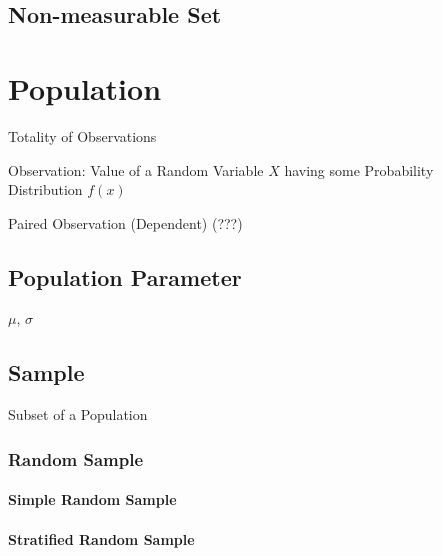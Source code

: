 \subsection{Non-measurable Set}\label{sec:nonmeasurable_set}



\section{Population}\label{sec:population}

Totality of Observations

Observation: Value of a Random Variable $X$ having some Probability
Distribution $f(x)$

Paired Observation (Dependent) (???)



\subsection{Population Parameter}\label{sec:population_parameter}

$\mu$, $\sigma$



\subsection{Sample}\label{sec:sample}

Subset of a Population



\subsubsection{Random Sample}\label{sec:random_sample}

\paragraph{Simple Random Sample}\label{sec:simple_random_sample}\hfill

\paragraph{Stratified Random Sample}\label{sec:stratified_random_sample}\hfill



